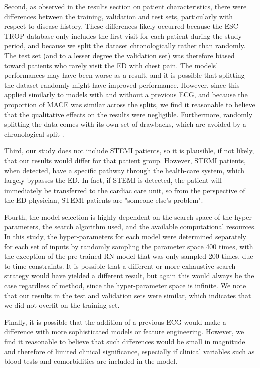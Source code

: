 \documentclass[preprint]{elsarticle}
\begin{document}
Second, as observed in the results section on patient characteristics, there were differences between the training, validation and test sets, particularly with respect to disease history. These differences likely occurred because the ESC-TROP database only includes the first visit for each patient during the study period, and because we split the dataset chronologically rather than randomly. The test set (and to a lesser degree the validation set) was therefore biased toward patients who rarely visit the ED with chest pain. The models’ performances may have been worse as a result, and it is possible that splitting the dataset randomly might have improved performance. However, since this applied similarly to models with and without a previous ECG, and because the proportion of MACE was similar across the splits, we find it reasonable to believe that the qualitative effects on the results were negligible. Furthermore, randomly splitting the data comes with its own set of drawbacks, which are avoided by a chronological split \citep{steyerberg2009}.

Third, our study does not include STEMI patients, so it is plausible, if not likely, that our results would differ for that patient group. However, STEMI patients, when detected, have a specific pathway through the health-care system, which largely bypasses the ED. In fact, if STEMI is detected, the patient will immediately be transferred to the cardiac care unit, so from the perspective of the ED physician, STEMI patients are "someone else's problem".

Fourth, the model selection is highly dependent on the search space of the hyper-parameters, the search algorithm used, and the available computational resources. In this study, the hyper-parameters for each model were determined separately for each set of inputs by randomly sampling the parameter space 400 times, with the exception of the pre-trained RN model that was only sampled 200 times, due to time constraints. It is possible that a different or more exhaustive search strategy would have yielded a different result, but again this would always be the case regardless of method, since the hyper-parameter space is infinite. We note that our results in the test and validation sets were similar, which indicates that we did not overfit on the training set. 

Finally, it is possible that the addition of a previous ECG would make a difference with more sophisticated models or feature engineering. However, we find it reasonable to believe that such differences would be small in magnitude and therefore of limited clinical significance, especially if clinical variables such as blood tests and comorbidities are included in the model.
\end{document}
